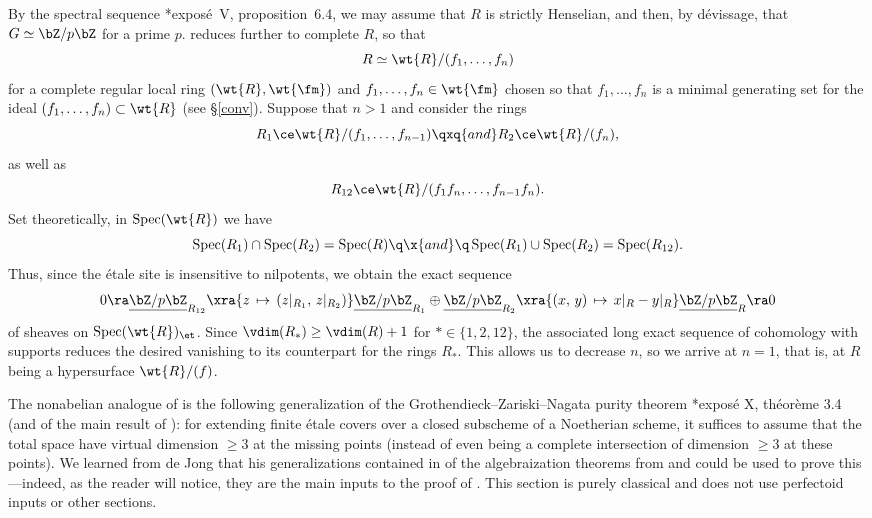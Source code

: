 By the spectral sequence \cite{SGA4II}*{expos\'{e}~V, proposition~6.4}, we may assume that $R$ is strictly Henselian, and then, by d\'{e}vissage, that $G \simeq \bZ/p\bZ$ for a prime $p$.  reduces further to complete $R$, so that %
\[
R \simeq \wt{R}/(f_1, \dotsc, f_n)
\]
for a complete regular local ring $(\wt{R}, \wt{\fm})$ and $f_1, \dotsc, f_n \in \wt{\fm}$ chosen so that $f_1, \dotsc, f_n$ is a minimal generating set for the ideal $(f_1, \dotsc, f_n) \subset \wt{R}$ (see \S\ref{conv}). Suppose that $n > 1$ and consider the rings
\[
R_1 \ce \wt{R}/(f_1, \dotsc, f_{n - 1}) \qxq{and} R_2 \ce \wt{R}/(f_n),
\]
as well as
\[
R_{12} \ce \wt{R}/(f_1f_n, \dotsc, f_{n - 1}f_n).
\]
Set theoretically, in $\Spec(\wt{R})$ we have
\[
\Spec(R_1) \cap \Spec(R_2) = \Spec(R) \q \x{and} \q \Spec(R_1) \cup \Spec(R_2) = \Spec(R_{12}).
\]
Thus, since the \'{e}tale site is insensitive to nilpotents, we obtain the exact sequence
\[
0 \ra \underline{\bZ/p\bZ}_{R_{12}} \xra{z\, \mapsto\, (z|_{R_1},\, z|_{R_2})} \underline{\bZ/p\bZ}_{R_1} \oplus \underline{\bZ/p\bZ}_{R_2} \xra{(x,\, y)\, \mapsto\, x|_R - y|_{R}} \underline{\bZ/p\bZ}_{R} \ra 0
\]
of sheaves on $\Spec(\wt{R})_\et$. Since $\vdim(R_*) \ge \vdim(R) + 1$ for $* \in \{1, 2, 12\}$, the associated long exact sequence of cohomology with supports reduces the desired vanishing to its counterpart for the rings $R_*$. This allows us to decrease $n$, so  we arrive at $n = 1$, that is, at $R$ being a hypersurface $\wt{R}/(f)$. %
\epf



















 



The nonabelian analogue of  is the following generalization of the Grothendieck--Zariski--Nagata purity theorem \cite{SGA2new}*{expos\'{e} X, th\'{e}or\`{e}me 3.4} (and of the main result of \cite{Cut95}): for extending finite \'{e}tale covers over a  closed subscheme of a Noetherian scheme, it suffices to assume that the total space have virtual dimension $\ge 3$ at the missing points (instead of even being a complete intersection of dimension $\ge 3$ at these points).
 We learned from de Jong that his generalizations contained in \cite{SP} of the algebraization theorems from \cite{SGA2new} and \cite{Ray75} could be used to prove this---indeed, as the reader will notice, they are the main inputs to the proof of . This section is purely classical and does not use perfectoid inputs or other sections.


